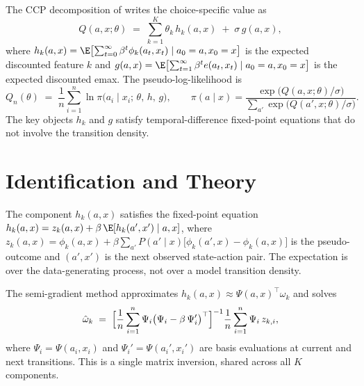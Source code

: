 \documentclass[10pt]{article}
\begin{document}
The CCP decomposition of \citet{hotzMiller1993} writes the choice-specific value as
\begin{equation}
\label{eq:ccp_decomp}
Q(a,x;\theta) \;=\; \sum_{k=1}^K \theta_k\,h_k(a,x) \;+\; \sigma\,g(a,x),
\end{equation}
where $h_k(a,x) = \E\bigl[\sum_{t=0}^\infty \beta^t \phi_k(a_t, x_t) \mid a_0 = a, x_0 = x\bigr]$ is the expected discounted feature $k$ and $g(a,x) = \E\bigl[\sum_{t=1}^\infty \beta^t e(a_t, x_t) \mid a_0 = a, x_0 = x\bigr]$ is the expected discounted emax.
The pseudo-log-likelihood is
\begin{equation}
\label{eq:pseudo_ll}
Q_n(\theta) \;=\; \frac{1}{n}\sum_{i=1}^n \ln \pi\!\bigl(a_i \mid x_i;\, \theta,\, h,\, g\bigr), \qquad \pi(a \mid x) = \frac{\exp\bigl(Q(a,x;\theta)/\sigma\bigr)}{\sum_{a'}\exp\bigl(Q(a',x;\theta)/\sigma\bigr)}.
\end{equation}
The key objects $h_k$ and $g$ satisfy temporal-difference fixed-point equations that do not involve the transition density.

\section{Identification and Theory}

\begin{proposition}
The component $h_k(a,x)$ satisfies the fixed-point equation $h_k(a,x) = z_k(a,x) + \beta\,\E[h_k(a',x') \mid a,x]$, where $z_k(a,x) = \phi_k(a,x) + \beta\sum_{a'} P(a' \mid x)\bigl[\phi_k(a',x) - \phi_k(a,x)\bigr]$ is the pseudo-outcome and $(a',x')$ is the next observed state-action pair.
The expectation is over the data-generating process, not over a model transition density.
\end{proposition}

The semi-gradient method approximates $h_k(a,x) \approx \Psi(a,x)^\top \omega_k$ and solves
\begin{equation}
\label{eq:semigradient}
\hat\omega_k \;=\; \Bigl[\frac{1}{n}\sum_{i=1}^n \Psi_i\bigl(\Psi_i - \beta\,\Psi_i'\bigr)^\top\Bigr]^{-1} \frac{1}{n}\sum_{i=1}^n \Psi_i\, z_{k,i},
\end{equation}
where $\Psi_i = \Psi(a_i, x_i)$ and $\Psi_i' = \Psi(a_i', x_i')$ are basis evaluations at current and next transitions.
This is a single matrix inversion, shared across all $K$ components.
\end{document}
